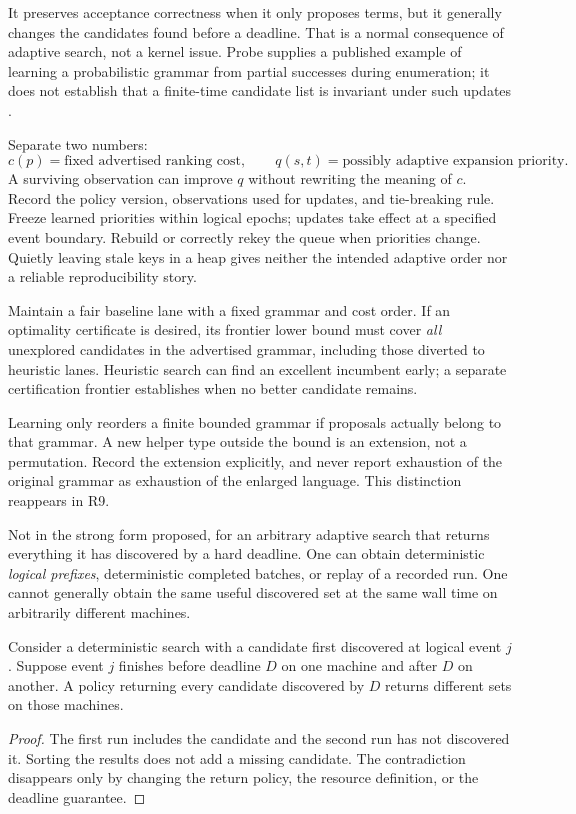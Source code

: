 \ans It preserves acceptance correctness when it only proposes terms, but it generally changes the candidates found before a deadline. That is a normal consequence of adaptive search, not a kernel issue. Probe supplies a published example of learning a probabilistic grammar from partial successes during enumeration; it does not establish that a finite-time candidate list is invariant under such updates \cite{probe}.

Separate two numbers:
\[
  c(p)=\text{fixed advertised ranking cost},\qquad
  q(s,t)=\text{possibly adaptive expansion priority}.
\]
A surviving observation can improve $q$ without rewriting the meaning of $c$. Record the policy version, observations used for updates, and tie-breaking rule. Freeze learned priorities within logical epochs; updates take effect at a specified event boundary. Rebuild or correctly rekey the queue when priorities change. Quietly leaving stale keys in a heap gives neither the intended adaptive order nor a reliable reproducibility story.

Maintain a fair baseline lane with a fixed grammar and cost order. If an optimality certificate is desired, its frontier lower bound must cover \emph{all} unexplored candidates in the advertised grammar, including those diverted to heuristic lanes. Heuristic search can find an excellent incumbent early; a separate certification frontier establishes when no better candidate remains.

Learning only reorders a finite bounded grammar if proposals actually belong to that grammar. A new helper type outside the bound is an extension, not a permutation. Record the extension explicitly, and never report exhaustion of the original grammar as exhaustion of the enlarged language. This distinction reappears in R9.

\ans Not in the strong form proposed, for an arbitrary adaptive search that returns everything it has discovered by a hard deadline. One can obtain deterministic \emph{logical prefixes}, deterministic completed batches, or replay of a recorded run. One cannot generally obtain the same useful discovered set at the same wall time on arbitrarily different machines.

\begin{proposition}
Consider a deterministic search with a candidate first discovered at logical event $j$. Suppose event $j$ finishes before deadline $D$ on one machine and after $D$ on another. A policy returning every candidate discovered by $D$ returns different sets on those machines.
\end{proposition}
\begin{proof}
The first run includes the candidate and the second run has not discovered it. Sorting the results does not add a missing candidate. The contradiction disappears only by changing the return policy, the resource definition, or the deadline guarantee.
\end{proof}

